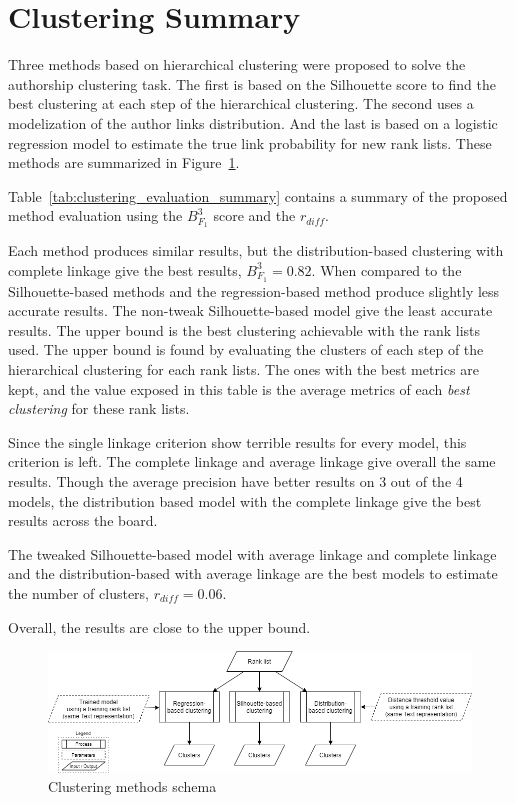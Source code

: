 \section{Clustering Summary}

Three methods based on hierarchical clustering were proposed to solve the authorship clustering task.
The first is based on the Silhouette score to find the best clustering at each step of the hierarchical clustering.
The second uses a modelization of the author links distribution.
And the last is based on a logistic regression model to estimate the true link probability for new rank lists.
These methods are summarized in Figure~\ref{fig:schema-clustering}.

Table~\ref{tab:clustering_evaluation_summary} contains a summary of the proposed method evaluation using the $B^3_{F_1}$ score and the $r_{diff}$.

Each method produces similar results, but the distribution-based clustering with complete linkage give the best results, $B^3_{F_1} = 0.82$.
When compared to the Silhouette-based methods and the regression-based method produce slightly less accurate results.
The non-tweak Silhouette-based model give the least accurate results.
The upper bound is the best clustering achievable with the rank lists used.
The upper bound is found by evaluating the clusters of each step of the hierarchical clustering for each rank lists.
The ones with the best metrics are kept, and the value exposed in this table is the average metrics of each \textit{best clustering} for these rank lists.

Since the single linkage criterion show terrible results for every model, this criterion is left.
The complete linkage and average linkage give overall the same results.
Though the average precision have better results on 3 out of the 4 models, the distribution based model with the complete linkage give the best results across the board.

The tweaked Silhouette-based model with average linkage and complete linkage and the distribution-based with average linkage are the best models to estimate the number of clusters, $r_{diff} = 0.06$.

Overall, the results are close to the upper bound.

\begin{figure}
  \centering
  \caption{Clustering methods schema}
  \label{fig:schema-clustering}
  \includegraphics[width=1\linewidth]{img/schema-clustering.png}
\end{figure}

